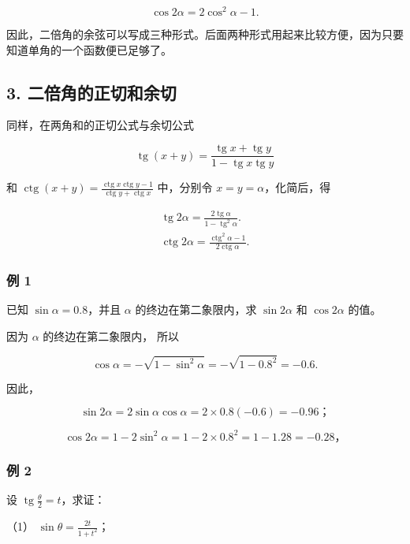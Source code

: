 \[
\cos 2 \alpha = 2 \cos^ {2} \alpha - 1.
\]

因此，二倍角的余弦可以写成三种形式。后面两种形式用起来比较方便，因为只要知道单角的一个函数便已足够了。

\subsection{3. 二倍角的正切和余切}

同样，在两角和的正切公式与余切公式

\[
\operatorname{tg} (x + y) = \frac {\operatorname{tg} x + \operatorname{tg} y}{1 - \operatorname{tg} x \operatorname{tg} y}
\]

和
\(\operatorname{ctg}(x + y) = \frac{\operatorname{ctg} x \operatorname{ctg} y - 1}{\operatorname{ctg} y + \operatorname{ctg} x}\)
中，分别令 \(x = y = \alpha\)，化简后，得

\[
\boxed { \begin{array}{l} \operatorname{tg} 2 \alpha = \frac {2 \operatorname{tg} \alpha}{1 - \operatorname{tg} ^ {2} \alpha}. \\ \operatorname{ctg} 2 \alpha = \frac {\operatorname{ctg} ^ {2} \alpha - 1}{2 \operatorname{ctg} \alpha}. \end{array} }
\]

\subsubsection{例 1}

已知 \(\sin\alpha=0.8\)，并且 \(\alpha\) 的终边在第二象限内，求
\(\sin2\alpha\) 和 \(\cos2\alpha\) 的值。

 因为 \(\alpha\) 的终边在第二象限内， 所以

\[
\cos \alpha = - \sqrt {1 - \sin^ {2} \alpha} = - \sqrt {1 - 0.8 ^ {2}} = - 0.6.
\]

因此，

\[
\sin 2 \alpha = 2 \sin \alpha \cos \alpha = 2 \times 0.8 (- 0.6) = - 0.96\text{；}
\]

\[
\cos 2 \alpha = 1 - 2 \sin^ {2} \alpha = 1 - 2 \times 0.8 ^ {2} = 1 - 1.28 = - 0.28\text{，}
\]

\subsubsection{例 2}

设 \(\operatorname{tg} \frac{\theta}{2} = t\)，求证：

（1） \(\sin\theta=\frac{2t}{1+t^2}\)；

